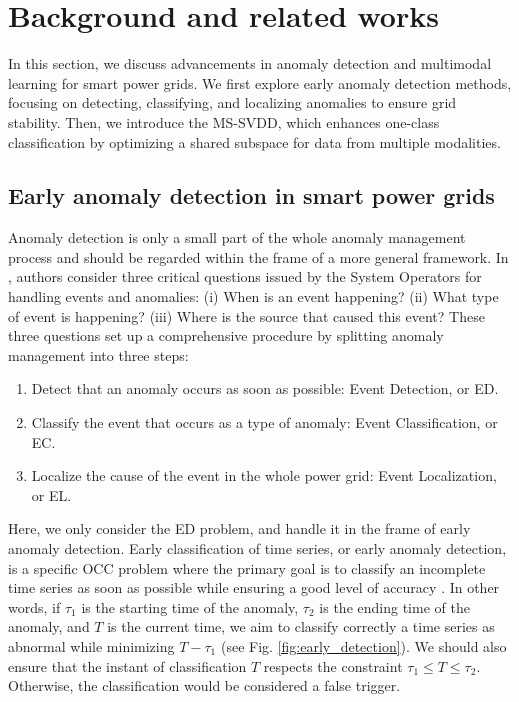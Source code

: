 \section{Background and related works}
In this section, we discuss advancements in anomaly detection and multimodal learning for smart power grids. We first explore early anomaly detection methods, focusing on detecting, classifying, and localizing anomalies to ensure grid stability. Then, we introduce the MS-SVDD, which enhances one-class classification by optimizing a shared subspace for data from multiple modalities.
\subsection{Early anomaly detection in smart power grids}
Anomaly detection is only a small part of the whole anomaly management process and should be regarded within the frame of a more general framework. In \cite{zheng2021psml}, authors consider three critical questions issued by the System Operators for handling events and anomalies: (i) When is an event happening? (ii) What type of event is happening? (iii) Where is the source that caused this event?  
These three questions set up a comprehensive procedure by splitting anomaly management into three steps:

\begin{enumerate}
    \item Detect that an anomaly occurs as soon as possible: Event Detection, or ED.
    \item Classify the event that occurs as a type of anomaly: Event Classification, or EC.
    \item Localize the cause of the event in the whole power grid: Event Localization, or EL.
\end{enumerate}
Here, we only consider the ED problem, and handle it in the frame of early anomaly detection. Early classification of time series, or early anomaly detection, is a specific OCC problem where the primary goal is to classify an incomplete time series as soon as possible while ensuring a good level of accuracy \cite{9207873}. In other words, if $\tau_1$ is the starting time of the anomaly, $\tau_2$ is the ending time of the anomaly, and $T$ is the current time, we aim to classify correctly a time series as abnormal while minimizing $T - \tau_1$ (see Fig. \ref{fig:early_detection}). We should also ensure that the instant of classification $T$ respects the constraint $\tau_1 \leq T \leq \tau_2$. Otherwise, the classification would be considered a false trigger.

